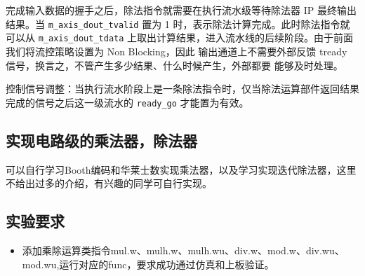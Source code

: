 完成输入数据的握手之后，除法指令就需要在执行流水级等待除法器 IP 最终输出结果。当
\texttt{m\_axis\_dout\_tvalid} 置为 1 时，表示除法计算完成。此时除法指令就可以从 \texttt{m\_axis\_dout\_tdata}
上取出计算结果，进入流水线的后续阶段。由于前面我们将流控策略设置为 Non Blocking，因此
输出通道上不需要外部反馈 tready 信号，换言之，不管产生多少结果、什么时候产生，外部都要
能够及时处理。

控制信号调整：当执行流水阶段上是一条除法指令时，仅当除法运算部件返回结果完成的信号之后这一级流水的 \texttt{ready\_go} 才能置为有效。


\subsection{实现电路级的乘法器，除法器}

可以自行学习Booth编码和华莱士数实现乘法器，以及学习实现迭代除法器，这里不给出过多的介绍，有兴趣的同学可自行实现。

\subsection{实验要求}

\begin{itemize}
    \item 添加乘除运算类指令mul.w、mulh.w、mulh.wu、div.w、mod.w、div.wu、mod.wu,运行对应的func，要求成功通过仿真和上板验证。
\end{itemize}